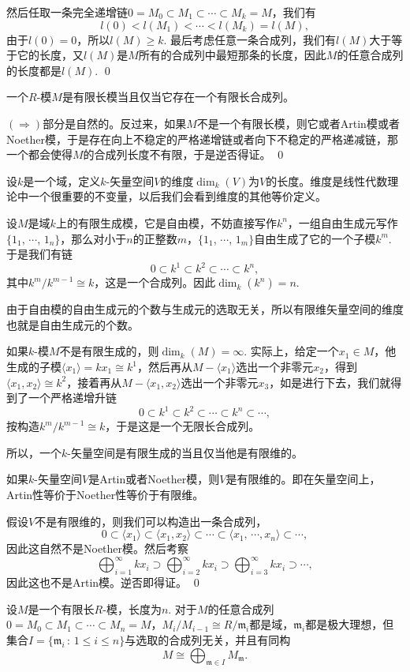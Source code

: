 	然后任取一条完全递增链$0=M_0\subset M_1\subset \cdots\subset M_k=M$，我们有
	\[
	l(0)<l(M_1)<\cdots<l(M_k)=l(M),
	\]
	由于$l(0)=0$，所以$l(M)\geq k$. 最后考虑任意一条合成列，我们有$l(M)$大于等于它的长度，又$l(M)$是$M$所有的合成列中最短那条的长度，因此$M$的任意合成列的长度都是$l(M)$.
\qed

\pro 一个$R$-模$M$是有限长模当且仅当它存在一个有限长合成列。

\proof
	$(\Rightarrow)$部分是自然的。反过来，如果$M$不是一个有限长模，则它或者Artin模或者Noether模，于是存在向上不稳定的严格递增链或者向下不稳定的严格递减链，那一个都会使得$M$的合成列长度不有限，于是逆否得证。
\qed

\para 设$k$是一个域，定义$k$-矢量空间$V$的维度$\dim_k(V)$为$V$的长度。维度是线性代数理论中一个很重要的不变量，以后我们会看到维度的其他等价定义。

设$M$是域$k$上的有限生成模，它是自由模，不妨直接写作$k^n$，一组自由生成元写作$\{1_1$, $\cdots$, $1_n\}$，那么对小于$n$的正整数$m$，$\{1_1$, $\cdots$, $1_m\}$自由生成了它的一个子模$k^m$. 于是我们有链
\[
	0\subset k^1\subset  k^2 \subset \cdots \subset k^n,
\]
其中$k^m/k^{m-1}\cong k$，这是一个合成列。因此$\dim_k(k^n)=n$. 

由于自由模的自由生成元的个数与生成元的选取无关，所以有限维矢量空间的维度也就是自由生成元的个数。

如果$k$-模$M$不是有限生成的，则$\dim_k(M)=\infty$. 实际上，给定一个$x_1\in M$，他生成的子模$\langle x_1\rangle=kx_1\cong k^1$，然后再从$M-\langle x_1\rangle$选出一个非零元$x_2$，得到$\langle x_1,x_2\rangle\cong k^2$，接着再从$M-\langle x_1,x_2\rangle$选出一个非零元$x_3$，如是进行下去，我们就得到了一个严格递增升链
\[
	0\subset k^1\subset k^2\subset \cdots \subset k^n\subset \cdots,
\]
按构造$k^m/k^{m-1}\cong k$，于是这是一个无限长合成列。

所以，一个$k$-矢量空间是有限生成的当且仅当他是有限维的。

\pro 如果$k$-矢量空间$V$是Artin或者Noether模，则$V$是有限维的。即在矢量空间上，Artin性等价于Noether性等价于有限维。

\proof
	假设$V$不是有限维的，则我们可以构造出一条合成列，
	\[
	0\subset \langle x_1\rangle\subset \langle x_1,x_2\rangle\subset \cdots \subset \langle x_1,\,\cdots\!,x_n\rangle\subset \cdots,
	\]
	因此这自然不是Noether模。然后考察
	\[
		\bigoplus_{i=1}^\infty kx_i \supset \bigoplus_{i=2}^\infty kx_i \supset \bigoplus_{i=3}^\infty kx_i\supset \cdots,
	\]
	因此这也不是Artin模。逆否即得证。
\qed


\theo 设$M$是一个有限长$R$-模，长度为$n$. 对于$M$的任意合成列$0=M_0\subset M_1\subset \cdots\subset M_n=M$，$M_i/M_{i-1}\cong R/\mathfrak{m}_i$都是域，$\mathfrak{m}_i$都是极大理想，但集合$I=\{\mathfrak{m}_i\,:\,1\leq i\leq n\}$与选取的合成列无关，并且有同构
\[
	M\cong \bigoplus_{\mathfrak{m}\in I} M_\mathfrak{m}.
\]

